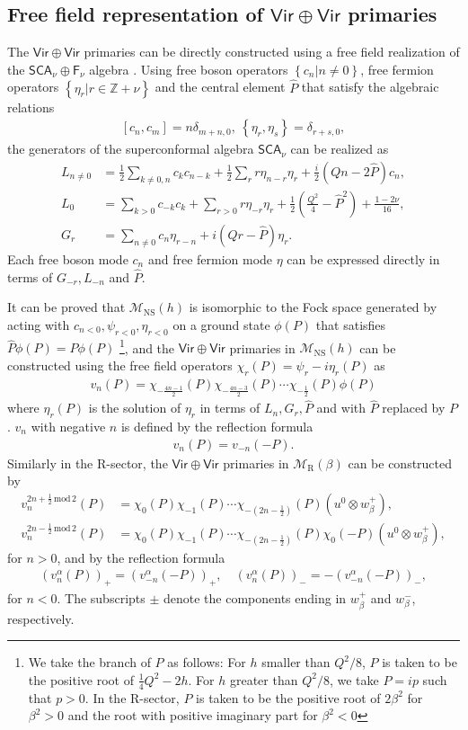 \documentclass[aps,10pt,twocolumn,superscriptaddress]{revtex4-2}
\def\ie{\begin{equation}\begin{aligned}}
\def\fe{\end{aligned}\end{equation}}
\def\NS{\mathrm{NS}}
\def\R{\mathrm{R}}
\begin{document}
\begin{appendix}

\section{Free field representation of $\mathsf{Vir}\oplus \mathsf{Vir}$ primaries}

\label{app:freefield}

The $\mathsf{Vir}\oplus \mathsf{Vir}$ primaries can be directly constructed using a free field realization of the $\mathsf{SCA}_\nu \oplus \mathsf{F}_{\nu}$ algebra \cite{Hadasz:2013dza}. Using free boson operators $\left\{c_n | n\neq 0\right\}$, free fermion operators $\left\{\eta_r| r\in \mathbb{Z}+\nu\right\}$ and the central element $\hat{P}$ that satisfy the algebraic relations
\ie
[c_n,c_m] =n\delta_{m+n,0}, ~\left\{\eta_r,\eta_s\right\}= \delta_{r+s,0},
\fe
the generators of the superconformal algebra $\mathsf{SCA}_\nu$ can be realized as
\ie
L_{n\neq 0} & =\frac{1}{2} \sum_{k \neq 0, n} c_k c_{n-k}+\frac{1}{2} \sum_r r \eta_{n-r} \eta_r+\frac{i}{2}(Q n - 2 \hat{P}) c_n, \\
L_0 & =\sum_{k>0} c_{-k} c_k+\sum_{r>0} r \eta_{-r} \eta_r+\frac{1}{2}\left(\frac{Q^2}{4}-\hat{P}^2\right)+\frac{1-2\nu}{16}, \\
G_r & =\sum_{n \neq 0} c_n \eta_{r-n}+i(Q r - \hat{P}) \eta_r.
\fe
Each free boson mode $c_n$ and free fermion mode $\eta$ can be expressed directly in terms of $G_{-r}, L_{-n}$ and $\hat{P}$. 

It can be proved that $\mathcal{M}_{\NS}(h)$ is isomorphic to the Fock space generated by acting with $c_{n<0}, \psi_{r<0}, \eta_{r<0}$ on a ground state $\phi(P)$ that satisfies $\hat{P}\phi(P)=P\phi(P)$ \footnote{We take the branch of $P$ as follows: For $h$ smaller than $Q^2/8$, $P$ is taken to be the positive root of $\frac{1}{4}Q^2-2h$. For $h$ greater than $Q^2/8$, we take $P=ip$ such that $p>0$. In the R-sector, $P$ is taken to be the positive root of $2\beta^2$ for $\beta^2 >0$ and the root with positive imaginary part for $\beta^2 <0$}, and the $\mathsf{Vir}\oplus\mathsf{Vir}$ primaries in $\mathcal{M}_{\NS}(h)$ can be constructed using the free field operators $\chi_{r}(P) = \psi_r - i\eta_r(P)$ as
\ie \label{vNS}
v_n(P) = \chi_{-\frac{4n-1}{2}}(P)\chi_{-\frac{4n-3}{2}}(P)\cdots \chi_{-\frac{1}{2}}(P)\phi(P)
\fe
where $\eta_r(P)$ is the solution of $\eta_r$ in terms of $L_n, G_r, \hat{P}$ and with $\hat{P}$ replaced by $P$. $v_n$ with negative $n$ is defined by the reflection formula
\ie
v_n(P) = v_{-n}(-P).
\fe
Similarly in the R-sector, the $\mathsf{Vir}\oplus\mathsf{Vir}$ primaries in $\mathcal{M}_{\R}(\beta)$ can be constructed by
\ie \label{vR}
v_n^{2n+\frac{1}{2}\,\text{mod}\, 2}(P) &= \chi_0(P)\chi_{-1}(P)\cdots \chi_{-(2n-\frac{1}{2})}(P)(u^0\otimes w_\beta^+),\\
v_n^{2n-\frac{1}{2}\,\text{mod}\,2}(P) &= \chi_0(P)\chi_{-1}(P)\cdots \chi_{-(2n-\frac{1}{2})}(P)\chi_0(-P)(u^0\otimes w_\beta^+),
\fe
for $n>0$, and by the reflection formula
\ie
(v^\alpha_{n}(P))_+ = (v_{-n}^\alpha(-P))_+,\quad (v^\alpha_{n}(P))_- = -(v_{-n}^\alpha(-P))_-,
\fe
for $n<0$. The subscripts $\pm$ denote the components ending in \(w_\beta^+\) and \(w_\beta^-\), respectively. 

\end{appendix}



\end{document}
